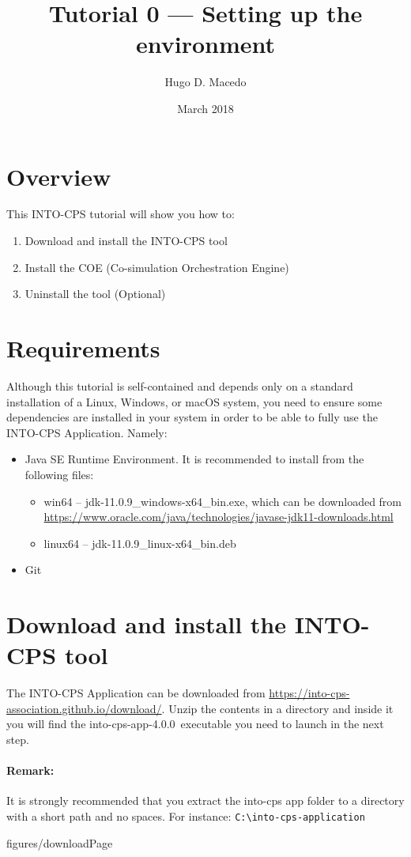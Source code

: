 \documentclass[11pt,a4paper]{../tutorial}
\title{Tutorial 0 --- Setting up the environment}
\date{March 2018}
\author{Hugo D. Macedo}
\def\intocpsVer{4.0.0}
\newcommand{\JavaURL}{https://www.oracle.com/java/technologies/javase-jdk11-downloads.html}
\newcommand{\JavaVer}{jdk-11.0.9}
\begin{document}
\section*{Overview}

This INTO-CPS tutorial will show you how to:

\begin{enumerate}[noitemsep]
\item Download and install the INTO-CPS tool
\item Install the COE (Co-simulation Orchestration Engine)
\item Uninstall the tool (Optional) 
\end{enumerate}

\section*{Requirements}

Although this tutorial is self-contained and depends only on a standard
installation of a Linux, Windows, or macOS system, you need to ensure some
dependencies are installed in your system in order to be able to fully use the
INTO-CPS Application. Namely: 

\begin{itemize}[noitemsep]
	\item Java SE Runtime Environment. It is recommended to install from the following files: 
	\begin{itemize}
	\item win64 -- \JavaVer\_windows-x64\_bin.exe, which can be downloaded from \url{\JavaURL} 
	\item linux64 -- \JavaVer\_linux-x64\_bin.deb
	\end{itemize}
\item Git
\end{itemize}


\section{Download and install the INTO-CPS tool}


\begin{instructions} 

\item The INTO-CPS Application can be downloaded from
	\url{https://into-cps-association.github.io/download/}. Unzip the
	contents in a directory and inside it you will find the into-cps-app-\intocpsVer\
	executable you need to launch in the next step.
  
  \paragraph{Remark:} It is strongly recommended that you extract the into-cps app folder to a directory with a short path and no spaces. For instance: \verb|C:\into-cps-application|
	
	\begin{annotation}[width=0.85\linewidth]{figures/downloadPage}
	\end{annotation}

\end{instructions}
\end{document}
